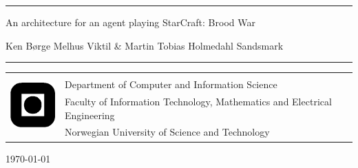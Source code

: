 \documentclass[a4paper, twoside, openright, 12pt]{report}
\title{\papertitle}
\author{\authors}
\def \authors {Ken B\o{}rge Melhus Viktil \& Martin Tobias Holmedahl Sandsmark}
\def \papertitle {An architecture for an agent playing StarCraft: Brood War}
\begin{document}
\begin{titlepage}
\begin{center}

\vspace*{8cm}
\hrule height 1pt
\vspace{.5cm}
\huge{\papertitle}

\vspace{.5cm}
\large{\authors}
\vspace{.5cm}
\hrule height 1pt

\vspace{6cm}
\end{center}
\normalsize
\begin{table}[!h]
\begin{tabular}{ll}
\multirow{4}{*}{\includegraphics[width=20mm]{graphics/logo.png}} & \\
& Department of Computer and Information Science \\
& Faculty of Information Technology, Mathematics and Electrical Engineering \\
& Norwegian University of Science and Technology \\
\end{tabular}
\end{table}
\vspace{.5cm}
\begin{center}
\today
\end{center}
\end{titlepage}

\thispagestyle{empty}
\cleardoublepage

\begin{abstract}
We present an overview of the most important aspect of the game StarCraft as
pertaining to designing a computer program that can play it using artificial
intelligence methods. We then present existing approaches to agent architectures
for playing StarCraft, and an analysis of these. We also present an overview of
an established architecture for simulating cognitive models, which has earlier
been used in robotics and first-person shooter games. Finally we present our own
architecture for an agent playing StarCraft, inspired by the aforementioned
cognitive architecture.

This we hope can be used for the final project with the goal of developing an
agent that can represent the Norwegian University of Technology and Science in
an international competition against other agents.
\end{abstract}
\thispagestyle{empty}
\cleardoublepage
\end{document}
